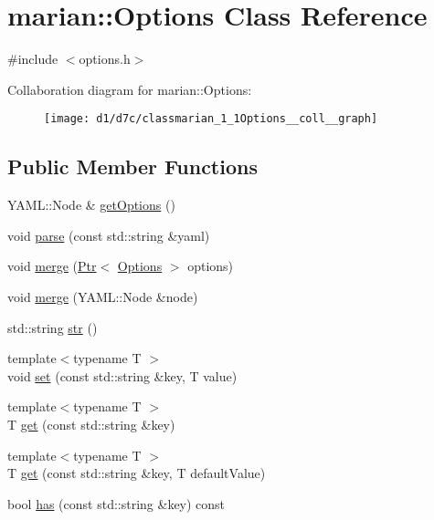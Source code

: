 \hypertarget{classmarian_1_1Options}{}\section{marian\+:\+:Options Class Reference}
\label{classmarian_1_1Options}


{\ttfamily \#include $<$options.\+h$>$}



Collaboration diagram for marian\+:\+:Options\+:
\nopagebreak
\begin{figure}[H]
\begin{center}
\leavevmode
\texttt{[image: d1/d7c/classmarian\_1\_1Options\_\_coll\_\_graph]}
\end{center}
\end{figure}
\subsection*{Public Member Functions}
\begin{DoxyCompactItemize}
\item 
Y\+A\+M\+L\+::\+Node \& \hyperlink{classmarian_1_1Options_afc681ad69bdc226f838bbfd39c77afd9}{get\+Options} ()
\item 
void \hyperlink{classmarian_1_1Options_a40aac40f3a04fe3b9c3f8ed05df5bcda}{parse} (const std\+::string \&yaml)
\item 
void \hyperlink{classmarian_1_1Options_aa8a98efcde6b45326a4dfc2804d6affa}{merge} (\hyperlink{namespacemarian_ad1a373be43a00ef9ce35666145137b08}{Ptr}$<$ \hyperlink{classmarian_1_1Options}{Options} $>$ options)
\item 
void \hyperlink{classmarian_1_1Options_a93bdef116f5adfab155e25c5de8859d2}{merge} (Y\+A\+M\+L\+::\+Node \&node)
\item 
std\+::string \hyperlink{classmarian_1_1Options_a04a75b2d9f04f5bd55e5aa290a088b6e}{str} ()
\item 
{\footnotesize template$<$typename T $>$ }\\void \hyperlink{classmarian_1_1Options_a5f051d6a378d6a51388be2e684216ffb}{set} (const std\+::string \&key, T value)
\item 
{\footnotesize template$<$typename T $>$ }\\T \hyperlink{classmarian_1_1Options_a01eb84ff527e7869fc1290b62736d884}{get} (const std\+::string \&key)
\item 
{\footnotesize template$<$typename T $>$ }\\T \hyperlink{classmarian_1_1Options_a9e4b05cf6ce7d43121c4e5a4f07e2c5d}{get} (const std\+::string \&key, T default\+Value)
\item 
bool \hyperlink{classmarian_1_1Options_aab78c7ac72cfe00d18970429b86fb514}{has} (const std\+::string \&key) const 
\end{DoxyCompactItemize}
